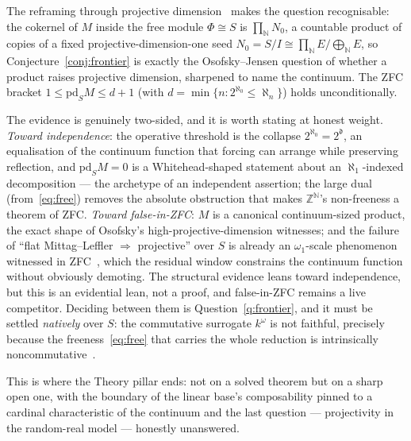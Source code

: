 \documentclass[11pt]{report}
\theoremstyle{plain}
\theoremstyle{definition}
\theoremstyle{remark}
\newcommand{\dd}{\mathfrak{d}}
\newcommand{\pd}{\mathrm{pd}}
\newcommand{\N}{\mathbb{N}}
\newcommand{\Z}{\mathbb{Z}}
\begin{document}
The reframing through projective dimension~\cite{macbeth-osofsky} makes the
question recognisable: the cokernel of $M$ inside the free module
$\Phi\cong S$ is $\prod_\N N_0$, a countable product of copies of a fixed
projective-dimension-one seed $N_0=S/I\cong\prod_\N E/\bigoplus_\N E$, so
Conjecture~\ref{conj:frontier} is exactly the Osofsky--Jensen question of
whether a product raises projective dimension, sharpened to name the continuum.
The ZFC bracket $1\le\pd_S M\le d+1$ (with $d=\min\{n:2^{\aleph_0}\le\aleph_n\}$)
holds unconditionally.

The evidence is genuinely two-sided, and it is worth stating at honest weight.
\emph{Toward independence}: the operative threshold is the collapse
$2^{\aleph_0}=2^{\dd}$, an equalisation of the continuum function that forcing
can arrange while preserving reflection, and $\pd_S M=0$ is a Whitehead-shaped
statement about an $\aleph_1$-indexed decomposition --- the archetype of an
independent assertion; the large dual (from~\eqref{eq:free}) removes the absolute
obstruction that makes $\Z^\N$'s non-freeness a theorem of ZFC.
\emph{Toward false-in-ZFC}: $M$ is a canonical continuum-sized product, the exact
shape of Osofsky's high-projective-dimension witnesses; and the failure of ``flat
Mittag--Leffler $\Rightarrow$ projective'' over $S$ is already an $\omega_1$-scale
phenomenon witnessed in ZFC~\cite{herbera-trlifaj}, which the residual window
constrains the continuum function without obviously demoting. The structural
evidence leans toward independence, but this is an evidential lean, not a proof,
and false-in-ZFC remains a live competitor. Deciding between them is
Question~\ref{q:frontier}, and it must be settled \emph{natively} over $S$: the
commutative surrogate $k^\omega$ is not faithful, precisely because the
freeness~\eqref{eq:free} that carries the whole reduction is intrinsically
noncommutative~\cite{macbeth-shadow}.

This is where the Theory pillar ends: not on a solved theorem but on a sharp
open one, with the boundary of the linear base's composability pinned to a
cardinal characteristic of the continuum and the last question --- projectivity
in the random-real model --- honestly unanswered.

\end{document}

